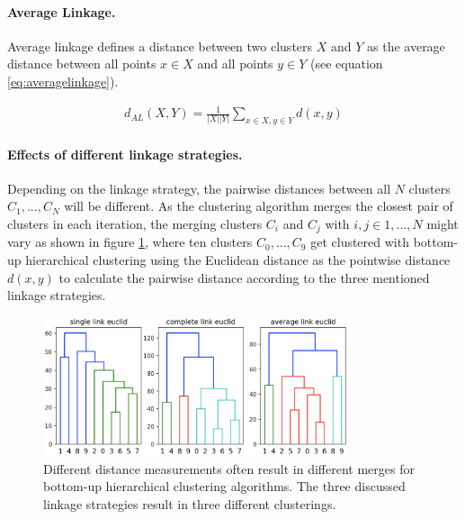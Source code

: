 \paragraph{Average Linkage.}

Average linkage defines a distance between two clusters $X$ and $Y$ as the average distance between all points $x \in X$ and all points $y \in Y$ (see equation \ref{eq:averagelinkage}).

\begin{equation}
    \begin{aligned}
        d_{AL}(X,Y) = \frac{1}{|X||Y|}\sum\limits_{x \in X, y \in Y} d(x,y)
    \end{aligned}
    \label{eq:averagelinkage}
\end{equation}

\paragraph{Effects of different linkage strategies.}

Depending on the linkage strategy, the pairwise distances between all $N$ clusters $C_1, ..., C_N$ will be different. As the clustering algorithm merges the closest pair of clusters in each iteration, the merging clusters $C_i$ and $C_j$ with $i, j \in 1,...,N$ might vary as shown in figure \ref{fig:linkage_effects}, where ten clusters $C_0, ..., C_9$ get clustered with bottom-up hierarchical clustering using the Euclidean distance as the pointwise distance $d(x,y)$ to calculate the pairwise distance according to the three mentioned linkage strategies.

\begin{figure}[h]
    \centering
    \includegraphics[width=0.8\textwidth]{images/linkage_effects}
    \caption{Different distance measurements often result in different merges for bottom-up hierarchical clustering algorithms. The three discussed linkage strategies result in three different clusterings.}
    \label{fig:linkage_effects}
\end{figure}

